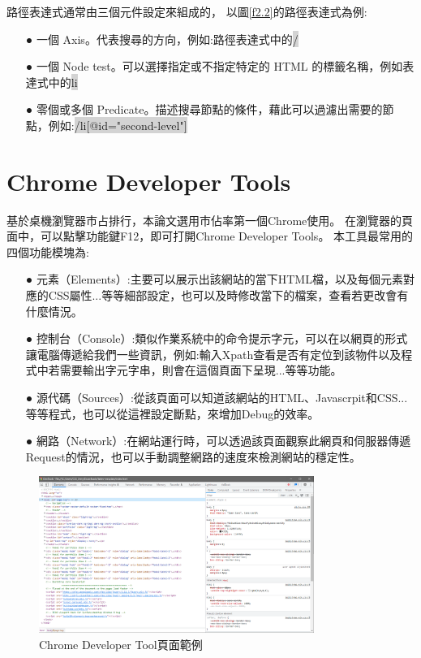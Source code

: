 路徑表達式通常由三個元件設定來組成的，
以圖\ref{f2.2}的路徑表達式為例:

\begin{itemize}
\item[●] 一個 Axis。代表搜尋的方向，例如:路徑表達式中的\colorbox{lightgray}{/}
\item[●] 一個 Node test。可以選擇指定或不指定特定的 HTML 的標籤名稱，例如表達式中的\colorbox{lightgray}{li}
\item[●] 零個或多個 Predicate。描述搜尋節點的條件，藉此可以過濾出需要的節點，例如:\colorbox{lightgray}{/li[@id="second-level"]}
\end{itemize}

\section{Chrome Developer Tools}\label{s2.5}
基於桌機瀏覽器市占排行，本論文選用市佔率第一個Chrome使用。
在瀏覽器的頁面中，可以點擊功能鍵F12，即可打開Chrome Developer Tools\cite{Chrome-Developer-Tools}。
本工具最常用的四個功能模塊為:
\begin{itemize}
    \item[●] 元素（Elements）:主要可以展示出該網站的當下HTML檔，以及每個元素對應的CSS屬性...等等細部設定，也可以及時修改當下的檔案，查看若更改會有什麼情況。
    \item[●] 控制台（Console）:類似作業系統中的命令提示字元，可以在以網頁的形式讓電腦傳遞給我們一些資訊，例如:輸入Xpath查看是否有定位到該物件以及程式中若需要輸出字元字串，則會在這個頁面下呈現...等等功能。
    \item[●] 源代碼（Sources）:從該頁面可以知道該網站的HTML、Javascrpit和CSS...等等程式，也可以從這裡設定斷點，來增加Debug的效率。
    \item[●] 網路（Network）:在網站運行時，可以透過該頁面觀察此網頁和伺服器傳遞Request的情況，也可以手動調整網路的速度來檢測網站的穩定性。
\end{itemize}

\begin{figure}[H]
    \centering
    \includegraphics[width=0.8\textwidth]{picture/ch2-chromeDeveloperTool.png}
    \caption{Chrome Developer Tool頁面範例}
    \label{f2.3}
\end{figure}

